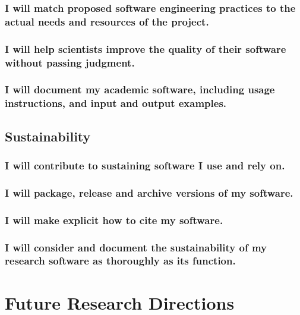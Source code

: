 \documentclass[a4paper,UKenglish]{dagman}
\renewcommand{\paragraph}[1]{\subsubsection*{#1}\xspace}
\begin{document}
\paragraph{I will match proposed software engineering practices to the actual needs and resources of the project.}

\paragraph{I will help scientists improve the quality of their software without passing judgment.}

\paragraph{I will document my academic software, including usage instructions, and input and output examples.}

\subsection{Sustainability}

\paragraph{I will contribute to sustaining software I use and rely on.}

\paragraph{I will package, release and archive versions of my software.}

\paragraph{I will make explicit how to cite my software.}

\paragraph{I will consider and document the sustainability of my research software as thoroughly as its function.}




\section{Future Research Directions}
\end{document}
